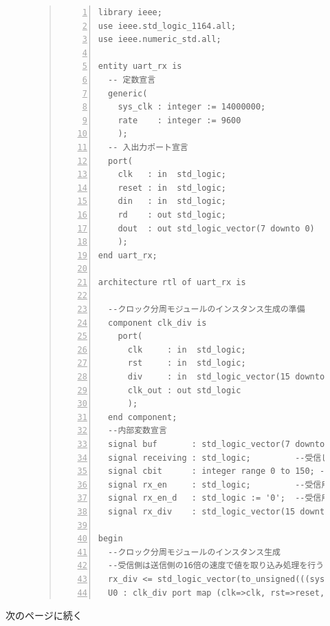 \documentclass[a4paper,dvipdfmx]{jsarticle}
\begin{document}
\begin{figure}[H]
\begin{quote}
\begin{Verbatim}[frame=single, numbers=left, baselinestretch=0.8]
library ieee;
use ieee.std_logic_1164.all;
use ieee.numeric_std.all;

entity uart_rx is
  -- 定数宣言
  generic(
    sys_clk : integer := 14000000;            --クロック周波数
    rate    : integer := 9600                 --転送レート,単位はbps(ビット毎秒)
    );
  -- 入出力ポート宣言
  port(
    clk   : in  std_logic;                    -- クロック
    reset : in  std_logic;                    -- リセット
    din   : in  std_logic;                    -- シリアル入力
    rd    : out std_logic;                    -- 受信完了を示す
    dout  : out std_logic_vector(7 downto 0)  -- 受信データ
    );
end uart_rx;

architecture rtl of uart_rx is

  --クロック分周モジュールのインスタンス生成の準備
  component clk_div is
    port(
      clk     : in  std_logic;
      rst     : in  std_logic;
      div     : in  std_logic_vector(15 downto 0);
      clk_out : out std_logic
      );
  end component;
  --内部変数宣言
  signal buf       : std_logic_vector(7 downto 0);   --受信データ系列の一時保存用
  signal receiving : std_logic;         --受信しているかどうか
  signal cbit      : integer range 0 to 150; -- データの取り込みタイミング用カウンタ
  signal rx_en     : std_logic;         --受信用クロック
  signal rx_en_d   : std_logic := '0';  --受信用クロック立ち上がり判定用レジスタ
  signal rx_div    : std_logic_vector(15 downto 0);  --クロック分周の倍率

begin
  --クロック分周モジュールのインスタンス生成
  --受信側は送信側の16倍の速度で値を取り込み処理を行う
  rx_div <= std_logic_vector(to_unsigned(((sys_clk / rate) / 16) - 1, 16));
  U0 : clk_div port map (clk=>clk, rst=>reset, div=>rx_div, clk_out=>rx_en);

\end{Verbatim}
\end{quote}
\end{figure}
次のページに続く
\end{document}

